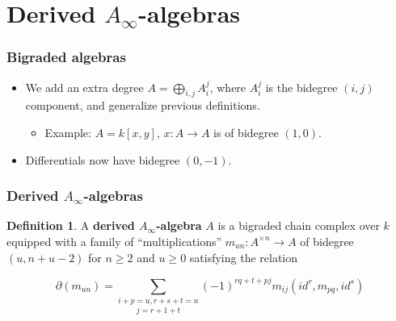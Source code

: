 \documentclass{beamer}
\theoremstyle{definition}
\newtheorem{defi}{Definition}
\begin{document}
\section{Derived $A_\infty$-algebras}

\begin{frame}
\frametitle{Bigraded algebras}
\begin{itemize}
\item We add an extra degree $A=\bigoplus_{i,j} A_i^j$, where $A_i^j$ is the bidegree $(i,j)$ component, and generalize previous definitions.
\begin{itemize}
\item<2-> Example: $A=k[x,y]$, $x:A\to A$ is of bidegree $(1,0)$.
\end{itemize}
\item<3-> Differentials now have bidegree $(0,-1)$. 
\end{itemize}
\end{frame}

\begin{frame}
\frametitle{Derived $A_\infty$-algebras}
\begin{defi}
A \textbf{derived $A_\infty$-algebra} $A$ is a bigraded  chain complex over $k$ equipped with a family of ``multiplications'' $m_{un}:A^{\times n}\to A$ of bidegree $(u,n+u-2)$ for $n\geq 2$ and $u\geq 0$ satisfying the relation

\[\partial(m_{un})=\underset{j=r+1+t}{\sum_{i+p=u,r+s+t=n}}(-1)^{rq+t+pj}m_{ij}(id^{ r}, m_{pq}, id^{ s})\] %
\end{defi}
\end{frame}
\end{document}
